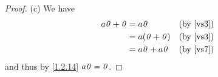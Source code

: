 \begin{proof}{(c)}
    We have
    \begin{align*}
        a\zv + \zv & = a\zv           &  & \text{(by \ref{vs3})} \\
                   & = a\p{\zv + \zv} &  & \text{(by \ref{vs3})} \\
                   & = a\zv + a\zv    &  & \text{(by \ref{vs7})}
    \end{align*}
    and thus by \cref{1.2.14} \(a\mathit{0} = \mathit{0}\).
\end{proof}
